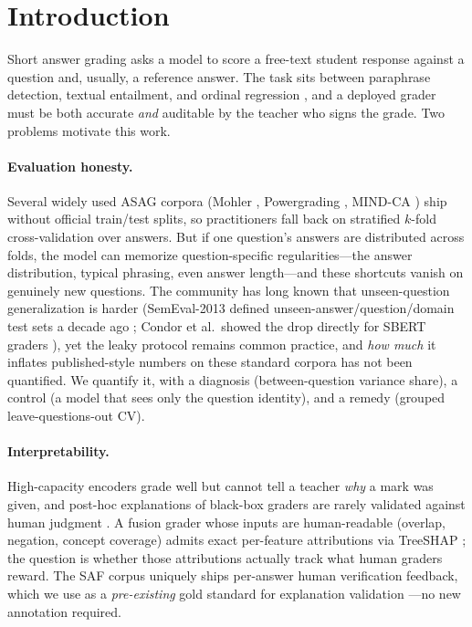 \documentclass[11pt]{article}
\begin{document}
\section{Introduction}
\label{sec:intro}

Short answer grading asks a model to score a free-text student response against
a question and, usually, a reference answer. The task sits between paraphrase
detection, textual entailment, and ordinal regression
\cite{burrows2015eras,dzikovska2013semeval}, and a deployed grader must be both
accurate \emph{and} auditable by the teacher who signs the grade. Two problems
motivate this work.

\paragraph{Evaluation honesty.}
Several widely used ASAG corpora (Mohler \cite{mohler2011learning},
Powergrading \cite{basu2013powergrading}, MIND-CA \cite{kovatchev2020mind})
ship without official train/test splits, so practitioners fall back on
stratified $k$-fold cross-validation over answers. But if one question's
answers are distributed across folds, the model can memorize
question-specific regularities---the answer distribution, typical phrasing,
even answer length---and these shortcuts \cite{geirhos2020shortcut} vanish on
genuinely new questions. The community has long known that unseen-question
generalization is harder (SemEval-2013 defined unseen-answer/question/domain
test sets a decade ago \cite{dzikovska2013semeval}; Condor et al.\ showed the
drop directly for SBERT graders \cite{condor2021automatic}), yet the leaky
protocol remains common practice, and \emph{how much} it inflates published-style
numbers on these standard corpora has not been quantified. We quantify it, with
a diagnosis (between-question variance share), a control (a model that sees
only the question identity), and a remedy (grouped leave-questions-out CV).

\paragraph{Interpretability.}
High-capacity encoders grade well but cannot tell a teacher \emph{why} a mark
was given, and post-hoc explanations of black-box graders are rarely validated
against human judgment \cite{poulton2021explaining,tornqvist2023exasag}. A
fusion grader whose inputs are human-readable (overlap, negation, concept
coverage) admits exact per-feature attributions via TreeSHAP
\cite{lundberg2017unified,lundberg2020local}; the question is whether those
attributions actually track what human graders reward. The SAF corpus
\cite{filighera2022your} uniquely ships per-answer human verification feedback,
which we use as a \emph{pre-existing} gold standard for explanation validation
---no new annotation required.
\end{document}
